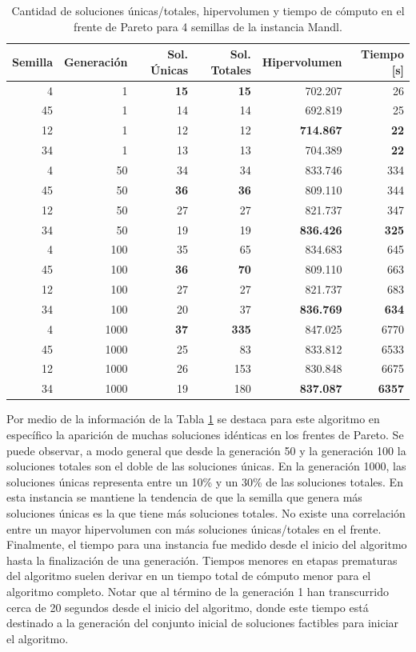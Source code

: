 \begin{table}[!htb]
\centering
\begin{tabular}{|r|r|r|r|r|r|}
\hline
Semilla & Generación & Sol. Únicas & Sol. Totales & Hipervolumen & Tiempo [s]\\ 
\hline \hline
4 & 1 & \textbf{15} & \textbf{15} & 702.207 & 26 \\ \hline
45 & 1 & 14 & 14 & 692.819 & 25 \\ \hline
12 & 1 & 12 & 12 & \textbf{714.867} & \textbf{22} \\ \hline
34 & 1 & 13 & 13 & 704.389 & \textbf{22} \\ \hline \hline
4 & 50 & 34 & 34 & 833.746 & 334 \\ \hline
45 & 50 & \textbf{36} & \textbf{36} & 809.110 & 344 \\ \hline
12 & 50 & 27 & 27 & 821.737 & 347 \\ \hline
34 & 50 & 19 & 19 & \textbf{836.426} & \textbf{325} \\ \hline\hline
4 & 100 & 35 & 65 & 834.683 & 645 \\ \hline
45 & 100 & \textbf{36} & \textbf{70} & 809.110 & 663 \\ \hline
12 & 100 & 27 & 27 & 821.737 & 683 \\ \hline
34 & 100 & 20 & 37 & \textbf{836.769} & \textbf{634} \\ \hline \hline
4 & 1000 & \textbf{37} & \textbf{335} & 847.025 & 6770 \\ \hline
45 & 1000 & 25 & 83 & 833.812 & 6533 \\ \hline
12 & 1000 & 26 & 153 & 830.848 & 6675 \\ \hline
34 & 1000 & 19 & 180 & \textbf{837.087} & \textbf{6357} \\ \hline
\end{tabular}
\caption{Cantidad de soluciones únicas/totales, hipervolumen y tiempo de cómputo en el frente de Pareto para 4 semillas de la instancia Mandl.}
\label{tab:dataFrenteMandl}
\end{table}

Por medio de la información de la Tabla \ref{tab:dataFrenteMandl} se destaca para este algoritmo en específico la aparición de muchas soluciones idénticas en los frentes de Pareto. Se puede observar, a modo general que desde la generación 50 y la generación 100 la soluciones totales son el doble de las soluciones únicas. En la generación 1000, las soluciones únicas representa entre un 10\% y un 30\% de las soluciones totales. En esta instancia se mantiene la tendencia de que la semilla que genera más soluciones únicas es la que tiene más soluciones totales. No existe una correlación entre un mayor hipervolumen con más soluciones únicas/totales en el frente. Finalmente, el tiempo para una instancia fue medido desde el inicio del algoritmo hasta la finalización de una generación. Tiempos menores en etapas prematuras del algoritmo suelen derivar en un tiempo total de cómputo menor para el algoritmo completo. Notar que al término de la generación 1 han transcurrido cerca de 20 segundos desde el inicio del algoritmo, donde este tiempo está destinado a la generación del conjunto inicial de soluciones factibles para iniciar el algoritmo.

